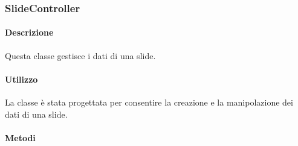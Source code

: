 \subsubsection{SlideController}
	\paragraph{Descrizione}
		Questa classe gestisce i dati di una slide.
	\paragraph{Utilizzo}
		La classe è stata progettata per consentire la creazione e la manipolazione dei dati di una slide.

	\paragraph{Metodi}
